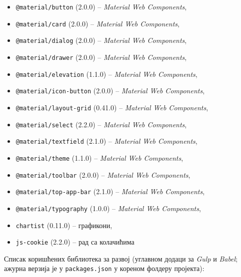 \vspace{0.2cm}
\begin{itemize}[noitemsep]
    \item \verb|@material/button| (2.0.0) -- \textit{Material Web Components},
    \item \verb|@material/card| (2.0.0) -- \textit{Material Web Components},
    \item \verb|@material/dialog| (2.0.0) -- \textit{Material Web Components},
    \item \verb|@material/drawer| (2.0.0) -- \textit{Material Web Components},
    \item \verb|@material/elevation| (1.1.0) --
        \textit{Material Web Components},
    \item \verb|@material/icon-button| (2.0.0) --
        \textit{Material Web Components},
    \item \verb|@material/layout-grid| (0.41.0) --
        \textit{Material Web Components},
    \item \verb|@material/select| (2.2.0) -- \textit{Material Web Components},
    \item \verb|@material/textfield| (2.1.0) --
        \textit{Material Web Components},
    \item \verb|@material/theme| (1.1.0) -- \textit{Material Web Components},
    \item \verb|@material/toolbar| (2.0.0) -- \textit{Material Web Components},
    \item \verb|@material/top-app-bar| (2.1.0) --
        \textit{Material Web Components},
    \item \verb|@material/typography| (1.0.0) --
        \textit{Material Web Components},
    \item \verb|chartist| (0.11.0) -- графикони,
    \item \verb|js-cookie| (2.2.0) -- рад са колачићима
\end{itemize}

\vspace{0.4cm}

Списак коришћених библиотека за развој (углавном додаци за \textit{Gulp} и
\textit{Babel}; ажурна верзија је у \verb|packages.json| у кореном фолдеру
пројекта):

